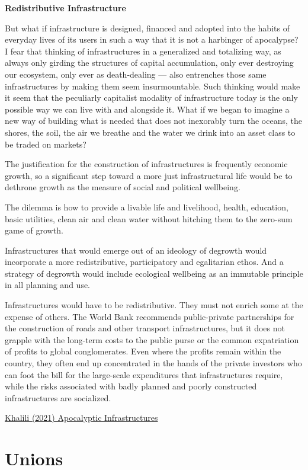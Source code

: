 \documentclass[
]{book}
\begin{document}
\textbf{Redistributive Infrastructure}

But what if infrastructure is designed, financed and adopted into the habits of everyday lives of its users in such a way that it is not a harbinger of apocalypse? I fear that thinking of infrastructures in a generalized and totalizing way, as always only girding the structures of capital accumulation, only ever destroying our ecosystem, only ever as death-dealing --- also entrenches those same infrastructures by making them seem insurmountable. Such thinking would make it seem that the peculiarly capitalist modality of infrastructure today is the only possible way we can live with and alongside it. What if we began to imagine a new way of building what is needed that does not inexorably turn the oceans, the shores, the soil, the air we breathe and the water we drink into an asset class to be traded on markets?

The justification for the construction of infrastructures is frequently economic growth, so a significant step toward a more just infrastructural life would be to dethrone growth as the measure of social and political wellbeing.

The dilemma is how to provide a livable life and livelihood, health, education, basic utilities, clean air and clean water without hitching them to the zero-sum game of growth.

Infrastructures that would emerge out of an ideology of degrowth would incorporate a more redistributive, participatory and egalitarian ethos. And a strategy of degrowth would include ecological wellbeing as an immutable principle in all planning and use.

Infrastructures would have to be redistributive. They must not enrich some at the expense of others. The World Bank recommends public-private partnerships for the construction of roads and other transport infrastructures, but it does not grapple with the long-term costs to the public purse or the common expatriation of profits to global conglomerates. Even where the profits remain within the country, they often end up concentrated in the hands of the private investors who can foot the bill for the large-scale expenditures that infrastructures require, while the risks associated with badly planned and poorly constructed infrastructures are socialized.

\href{https://www.noemamag.com/apocalyptic-infrastructures/}{Khalili (2021) Apocalyptic Infrastructures}

\hypertarget{unions}{%
\chapter{Unions}\label{unions}}
\end{document}
